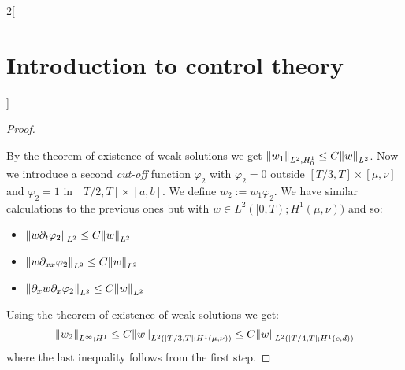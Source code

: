 \documentclass[../../../main_math.tex]{subfiles}
\begin{document}
\begin{multicols}{2}[\section{Introduction to control theory}]
\begin{proof}
\begin{itemize}
    \end{itemize}
    By the theorem of existence of weak solutions we get $\norm{w_1}_{L^2,H_0^1}\leq C\norm{w}_{L^2}$. Now we introduce a second \textit{cut-off} function $\varphi_2$ with $\varphi_2=0$ outside $[T/3,T]\times [\mu,\nu]$ and $\varphi_2=1$ in $[T/2,T]\times [a,b]$. We define $w_2:=w_1\varphi_2$. We have similar calculations to the previous ones but with $w\in L^2([0,T); H^1(\mu,\nu))$ and so:
    \begin{itemize}
      \item $\norm{w\partial_t\varphi_2}_{L^2}\leq C \norm{w}_{L^2}$
      \item $\norm{w\partial_{xx}\varphi_2}_{L^2}\leq C \norm{w}_{L^2}$
      \item $\norm{\partial_x w\partial_x\varphi_2}_{L^2}\leq C \norm{w}_{L^2}$
    \end{itemize}
    Using the theorem of existence of weak solutions we get:
    $$
      \norm{w_2}_{L^\infty;H^1}\leq C\norm{w}_{L^2([T/3,T]; H^1(\mu,\nu))}\leq C\norm{w}_{L^2([T/4,T]; H^1(c,d))}
    $$
    where the last inequality follows from the first step.
  \end{proof}

\end{multicols}
\end{document}
